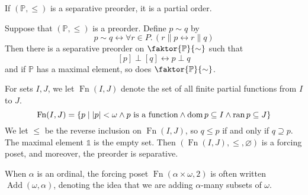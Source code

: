 \begin{proposition}
    If \( (\mathbb P, \leq) \) is a separative preorder, it is a partial order.
\end{proposition}
\begin{proposition}
    Suppose that \( (\mathbb P, \leq) \) is a preorder.
    Define \( p \sim q \) by
    \[ p \sim q \leftrightarrow \forall r \in P.\, (r \mathrel\| p \leftrightarrow r \mathrel\| q) \]
    Then there is a separative preorder on \( \faktor{\mathbb P}{\sim} \) such that
    \[ [p] \perp [q] \leftrightarrow p \perp q \]
    and if \( \mathbb P \) has a maximal element, so does \( \faktor{\mathbb P}{\sim} \).
\end{proposition}
\begin{example}
    For sets \( I, J \), we let \( \operatorname{Fn}(I, J) \) denote the set of all finite partial functions from \( I \) to \( J \).
    \[ \operatorname{Fn}(I, J) = \qty{p \mid \abs{p} < \omega \wedge p \text{ is a function} \wedge \operatorname{dom}p \subseteq I \wedge \operatorname{ran}p \subseteq J} \]
    We let \( \leq \) be the reverse inclusion on \( \operatorname{Fn}(I, J) \), so \( q \leq p \) if and only if \( q \supseteq p \).
    The maximal element \( \Bbbone \) is the empty set.
    Then \( (\operatorname{Fn}(I, J), \leq, \varnothing) \) is a forcing poset, and moreover, the preorder is separative.
\end{example}
\begin{remark}
    When \( \alpha \) is an ordinal, the forcing poset \( \operatorname{Fn}(\alpha \times \omega, 2) \) is often written \( \operatorname{Add}(\omega, \alpha) \), denoting the idea that we are adding \( \alpha \)-many subsets of \( \omega \).
\end{remark}

